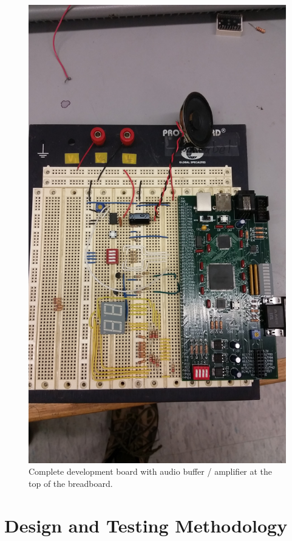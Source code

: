 \documentclass[11pt]{article}
\begin{document}
\begin{figure}[h!]
\centering
\includegraphics[scale=0.13]{board.jpg}
\caption{Complete development board with audio buffer / amplifier at the top of the breadboard.}
\label{fig:board}
\end{figure} 



\section{Design and Testing Methodology}
\end{document}
